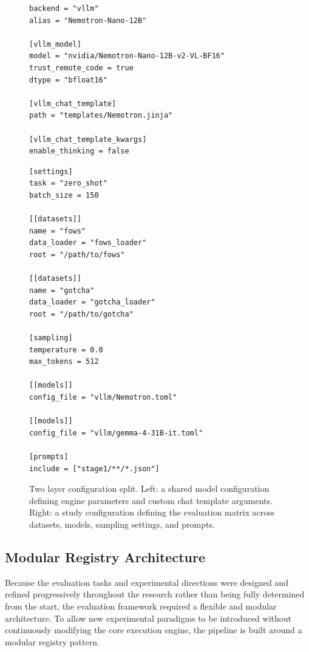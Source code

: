 \begin{figure}[t]
\begin{minipage}[t]{0.48\textwidth}
\begin{lstlisting}[basicstyle=\ttfamily\scriptsize,breaklines=true,frame=single,title={shared\_configs/models/vllm/Nemotron.toml}]
backend = "vllm"
alias = "Nemotron-Nano-12B"

[vllm_model]
model = "nvidia/Nemotron-Nano-12B-v2-VL-BF16"
trust_remote_code = true
dtype = "bfloat16"

[vllm_chat_template]
path = "templates/Nemotron.jinja"

[vllm_chat_template_kwargs]
enable_thinking = false
\end{lstlisting}
\end{minipage}
\hfill
\begin{minipage}[t]{0.48\textwidth}
\begin{lstlisting}[basicstyle=\ttfamily\scriptsize,breaklines=true,frame=single,title={studies/zero\_shot/stage1.toml}]
[settings]
task = "zero_shot"
batch_size = 150

[[datasets]]
name = "fows"
data_loader = "fows_loader"
root = "/path/to/fows"

[[datasets]]
name = "gotcha"
data_loader = "gotcha_loader"
root = "/path/to/gotcha"

[sampling]
temperature = 0.0
max_tokens = 512

[[models]]
config_file = "vllm/Nemotron.toml"

[[models]]
config_file = "vllm/gemma-4-31B-it.toml"

[prompts]
include = ["stage1/**/*.json"]
\end{lstlisting}
\end{minipage}
\caption{Two layer configuration split. Left: a shared model configuration defining engine parameters and custom chat template arguments. Right: a study configuration defining the evaluation matrix across datasets, models, sampling settings, and prompts.}
\label{fig:toml_configs}
\end{figure}

\subsection{Modular Registry Architecture}
\label{subsec:registry_architecture}

Because the evaluation tasks and experimental directions were designed and refined progressively throughout the research rather than being fully determined from the start, the evaluation framework required a flexible and modular architecture. To allow new experimental paradigms to be introduced without continuously modifying the core execution engine, the pipeline is built around a modular registry pattern.

